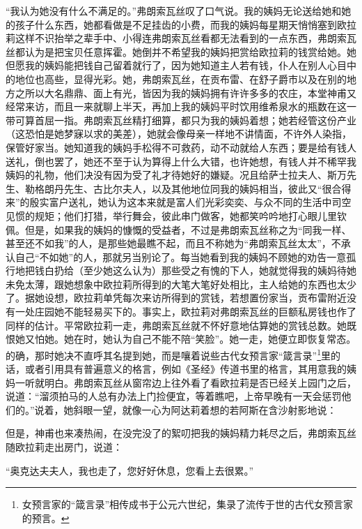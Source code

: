 \par “我认为她没有什么不满足的。”弗朗索瓦丝叹了口气说。我的姨妈无论送给她和她的孩子什么东西，她都看做是不足挂齿的小费，而我的姨妈每星期天悄悄塞到欧拉莉这样不识抬举之辈手中、小得连弗朗索瓦丝看都无法看到的一点东西，弗朗索瓦丝都认为是把宝贝任意挥霍。她倒并不希望我的姨妈把赏给欧拉莉的钱赏给她。她但愿我的姨妈能把钱自己留着就行了，因为她知道主人若有钱，仆人在别人心目中的地位也高些，显得光彩。她，弗朗索瓦丝，在贡布雷、在舒子爵市以及在别的地方之所以大名鼎鼎、面上有光，皆因为我的姨妈拥有许许多多的农庄，本堂神甫又经常来访，而且一来就聊上半天，再加上我的姨妈平时饮用维希泉水的瓶数在这一带可算首屈一指。弗朗索瓦丝精打细算，都只为我的姨妈着想；她若经管这份产业（这恐怕是她梦寐以求的美差），她就会像母亲一样地不讲情面，不许外人染指，保管好家当。她知道我的姨妈手松得不可救药，动不动就给人东西；要是给有钱人送礼，倒也罢了，她还不至于认为算得上什么大错，也许她想，有钱人并不稀罕我姨妈的礼物，他们决没有因为受了礼才待她好的嫌疑。况且给萨士拉夫人、斯万先生、勒格朗丹先生、古比尔夫人，以及其他地位同我的姨妈相当，彼此又“很合得来”的殷实富户送礼，她认为这本来就是富人们光彩奕奕、与众不同的生活中司空见惯的规矩；他们打猎，举行舞会，彼此串门做客，她都笑吟吟地打心眼儿里钦佩。但是，如果我的姨妈的慷慨的受益者，不过是弗朗索瓦丝称之为“同我一样、甚至还不如我”的人，是那些她最瞧不起，而且不称她为“弗朗索瓦丝太太”，不承认自己“不如她”的人，那就另当别论了。每当她看到我的姨妈不顾她的劝告一意孤行地把钱白扔给（至少她这么认为）那些受之有愧的下人，她就觉得我的姨妈待她未免太薄，跟她想象中欧拉莉所得到的大笔大笔好处相比，主人给她的东西也太少了。据她设想，欧拉莉单凭每次来访所得到的赏钱，若想置份家当，贡布雷附近没有一处庄园她不能轻易买下的。事实上，欧拉莉对弗朗索瓦丝的巨额私房钱也作了同样的估计。平常欧拉莉一走，弗朗索瓦丝就不怀好意地估算她的赏钱总数。她既恨她又怕她。她在时，她认为自己不能不陪“笑脸”。她一走，她便立即恢复常态。的确，那时她决不直呼其名提到她，而是嚷着说些古代女预言家“箴言录”\footnote{女预言家的“箴言录”相传成书于公元六世纪，集录了流传于世的古代女预言家的预言。}里的话，或者引用具有普遍意义的格言，例如《圣经》传道书里的格言，其用意我的姨妈一听就明白。弗朗索瓦丝从窗帘边上往外看了看欧拉莉是否已经关上园门之后，说道：“溜须拍马的人总有办法上门捡便宜，等着瞧吧，上帝早晚有一天会惩罚他们的。”说着，她斜眼一望，就像一心为阿达莉着想的若阿斯在含沙射影地说：
\par 但是，神甫也来凑热闹，在没完没了的絮叨把我的姨妈精力耗尽之后，弗朗索瓦丝随欧拉莉走出房门，说道：
\par “奥克达夫夫人，我也走了，您好好休息，您看上去很累。”
